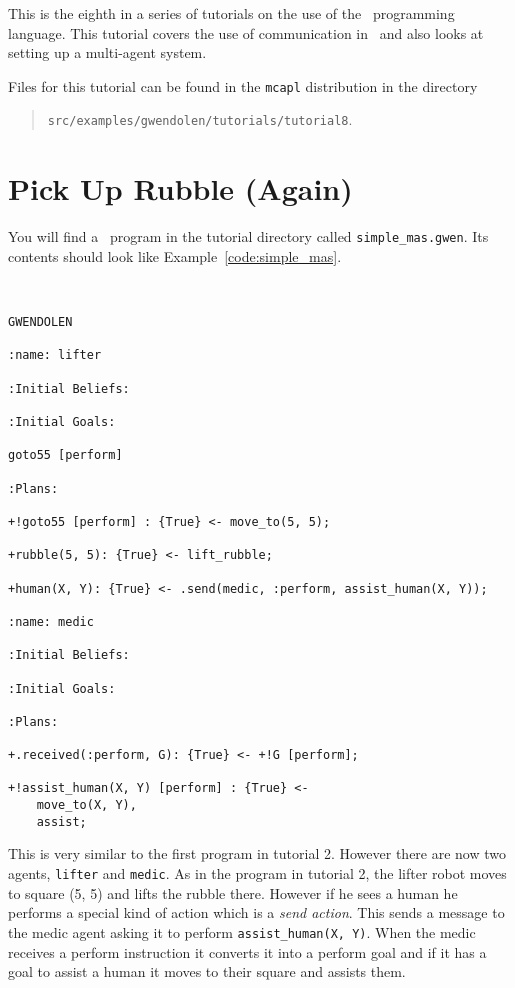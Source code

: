 
This is the eighth in a series of tutorials on the use of the \gwendolen\ programming language.  This tutorial covers the use of communication in \gwendolen\ and also looks at setting up a multi-agent system.

Files for this tutorial can be found in the \texttt{mcapl} distribution in the directory 
\begin{quote}
\texttt{src/examples/gwendolen/tutorials/tutorial8}.
\end{quote}

\section{Pick Up Rubble (Again)}

\begin{sloppypar}
You will find a \gwendolen\ program in the tutorial directory called \texttt{simple\_mas.gwen}.  Its contents should look like Example~\ref{code:simple_mas}.
\end{sloppypar}
\begin{ourexample}
\label{code:simple_mas} \quad \\
\begin{lstlisting}[basicstyle=\sffamily,style=easslisting,language=Gwendolen]
GWENDOLEN

:name: lifter

:Initial Beliefs:

:Initial Goals:

goto55 [perform]

:Plans:

+!goto55 [perform] : {True} <- move_to(5, 5);

+rubble(5, 5): {True} <- lift_rubble;

+human(X, Y): {True} <- .send(medic, :perform, assist_human(X, Y));

:name: medic

:Initial Beliefs:

:Initial Goals:

:Plans:

+.received(:perform, G): {True} <- +!G [perform];

+!assist_human(X, Y) [perform] : {True} <- 
	move_to(X, Y),
	assist;
\end{lstlisting}
\end{ourexample}

This is very similar to the first program in tutorial 2.  However  there are now two agents, \texttt{lifter} and \texttt{medic}.  As in the program in tutorial 2, the lifter robot moves to square (5, 5) and lifts the rubble there.  However if he sees a human he performs a special kind of action which is a \emph{send action}.  This sends a message to the medic agent asking it to perform \texttt{assist\_human(X, Y)}.  When the medic receives a perform instruction it converts it into a perform goal and if it has a goal to assist a human it moves to their square and assists them.

